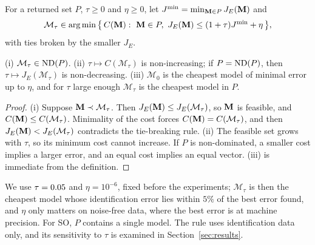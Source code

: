 \begin{definition}\label{def:tau}
For a returned set $P$, $\tau\ge0$ and $\eta\ge0$, let $J^{\min}=\min_{\mathbf{M}\in P}J_E(\mathbf{M})$ and
\begin{equation}
\mathcal M_\tau\in\arg\min\big\{\,C(\M):\ \M\in P,\ J_E(\M)\le(1+\tau)J^{\min}+\eta\,\big\},
\label{eq:tau}
\end{equation}
with ties broken by the smaller $J_E$.
\end{definition}

\begin{proposition}\label{prop:tau}
(i) $\mathcal M_\tau\in\operatorname{ND}(P)$. (ii) $\tau\mapsto C(\mathcal M_\tau)$ is non-increasing; if $P=\operatorname{ND}(P)$, then
$\tau\mapsto J_E(\mathcal M_\tau)$ is non-decreasing. (iii) $\mathcal M_0$ is the cheapest model of minimal error up
to $\eta$, and for $\tau$ large enough $\mathcal M_\tau$ is the cheapest model in $P$.
\end{proposition}
\begin{proof}
(i) Suppose $\mathbf{M}\prec\mathcal M_\tau$. Then $J_E(\mathbf{M})\le J_E(\mathcal M_\tau)$, so $\mathbf{M}$ is feasible, and
$C(\mathbf{M})\le C(\mathcal M_\tau)$. Minimality of the cost forces $C(\mathbf{M})=C(\mathcal M_\tau)$, and then
$J_E(\mathbf{M})<J_E(\mathcal M_\tau)$ contradicts the tie-breaking rule. (ii) The feasible set grows with $\tau$, so its
minimum cost cannot increase. If $P$ is non-dominated, a smaller cost implies a larger error, and an equal cost
implies an equal vector. (iii) is immediate from the definition.
\end{proof}

We use $\tau=0.05$ and $\eta=10^{-6}$, fixed before the experiments; $\mathcal M_\tau$ is then the cheapest model
whose identification error lies within $5\%$ of the best error found, and $\eta$ only matters on noise-free data,
where the best error is at machine precision. For SO, $P$ contains a single model. The rule uses identification
data only, and its sensitivity to $\tau$ is examined in Section~\ref{sec:results}.
